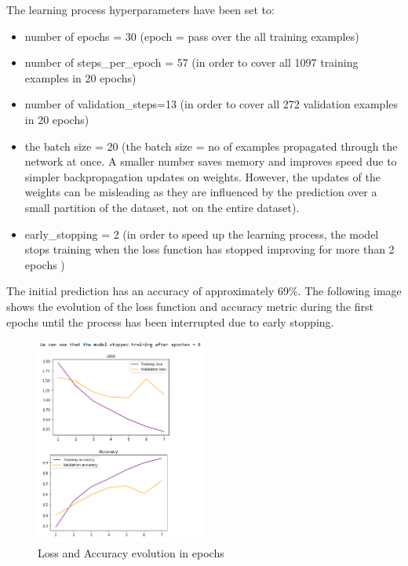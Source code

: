 \documentclass[a4paper,10pt]{article}
\begin{document}
 \quad The learning process hyperparameters have been set to:
  \begin{itemize}
 	\item number of epochs = 30 (epoch = pass over the all training examples)
 	\item number of steps\_per\_epoch = 57 (in order to cover all 1097 training examples in 20 epochs)
 	\item number of validation\_steps=13 (in order to cover all 272 validation examples in 20 epochs)
 	\item the batch size = 20 (the batch size = no of examples propagated through the network at once. A smaller number saves memory and improves speed due to simpler backpropagation updates on weights. However, the updates of the weights can be misleading as they are influenced by the prediction over a small partition of the dataset, not on the entire dataset).
 	\item early\_stopping = 2 (in order to speed up the learning process, the model stops training when the loss function has stopped improving for more than 2
 	epochs ) 
 		
 \end{itemize}

\quad The initial prediction has an accuracy of approximately 69\%. The following image shows the evolution of the loss function and accuracy metric during the first epochs until the process has been interrupted due to early stopping.
 
 \begin{figure}[!htbp]
	\centering
	\includegraphics[width=0.5\textwidth]{lossacc.png}
	\caption{Loss and Accuracy evolution in epochs}
\end{figure}
\vspace{5mm} %
  
\end{document}

